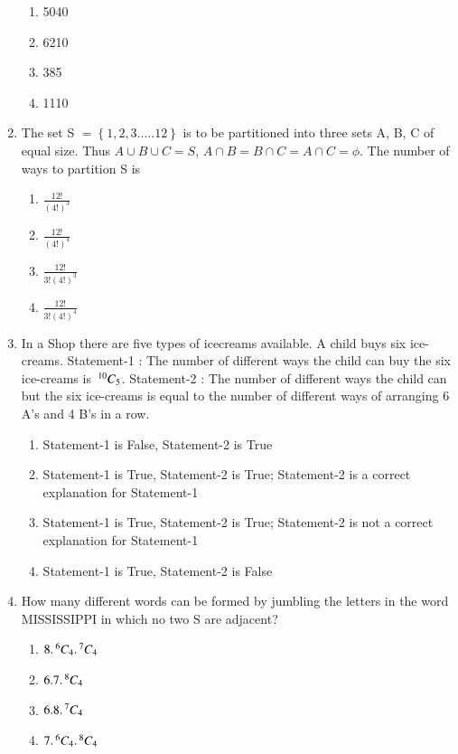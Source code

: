 \begin{enumerate}[label=\arabic*.,ref=\thesubsection.\theenumi]
\begin{enumerate}
\item 5040
\item 6210 
\item 385
\item 1110\\
\end{enumerate} 
\item The set S $= \left\lbrace1,2,3.....12\right\rbrace$ is to be partitioned into three sets A, B, C of equal size. Thus $A \cup B \cup C = S$, $A \cap B=B \cap C=A \cap C= \phi$. The number of ways to partition S is 
\begin{enumerate}
\item $\frac{12!}{(4!)^3}$
\item $\frac{12!}{(4!)^4}$
\item $\frac{12!}{3!(4!)^3}$
\item $\frac{12!}{3!(4!)^4}$\\
\end{enumerate} 
\item In a Shop there are five types of icecreams available. A child buys six ice-creams.
Statement-1 : The number of different ways the child can buy the six ice-creams is $\,^{10}C_{5}$.
Statement-2 : The number of different ways the child can but the six ice-creams is equal to the number of different ways of arranging 6 A's and 4 B's in a row.
\begin{enumerate}
\item Statement-1 is False, Statement-2 is True
\item Statement-1 is True, Statement-2 is True; Statement-2 is a correct explanation for Statement-1
\item Statement-1 is True, Statement-2 is True; Statement-2 is not a correct explanation for Statement-1
\item Statement-1 is True, Statement-2 is False\\ 
\end{enumerate}
\item How many different words can be formed by jumbling the letters in the word MISSISSIPPI in which no two S are adjacent?
\begin{enumerate}
\item $8.\,^{6}C_{4}.\,^{7}C_{4}$
\item $6.7.\,^{8}C_{4}$
\item $6.8.\,^{7}C_{4}$
\item $7.\,^{6}C_{4}.\,^{8}C_{4}$\\
\end{enumerate}   

\end{enumerate}
